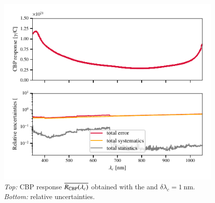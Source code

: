 \begin{figure}[h]
    \centering
    \includegraphics[width=\columnwidth]{fig/cbp_response.pdf}
    \caption{\textit{Top:} CBP response $\overline{R_{\mathrm{CBP}}(\lambda_c)}$ obtained with the \bpinhole and $\delta \lambda_c = \SI{1}{\nm}$. \textit{Bottom:} relative uncertainties.}
    \label{fig:cbp_response}
\end{figure}